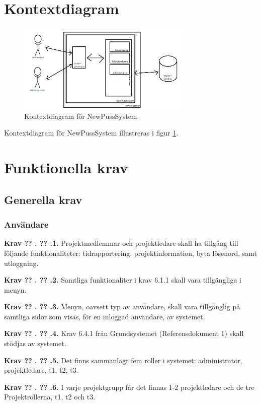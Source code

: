 \documentclass[a4paper]{article}
\newcommand\getcurrentref[1]{%
 \ifnumequal{\value{#1}}{0}
  {??}
  {\the\value{#1}}%
}
\newcommand\requirement[2]{
	\numberedrow{Krav}{#1}{#2}
}
\newcommand\numberedrow[3]{
	\noindent
	\textbf{#1 \getcurrentref{section}.\getcurrentref{subsection}.#2.} #3
	
}
\begin{document}
\section{Kontextdiagram}

\begin{figure}[H]
  \centering
    \includegraphics[width=0.75\textwidth]{context}
   \caption{Kontextdiagram för NewPussSystem.}
   \label{image_kontext}
\end{figure}
Kontextdiagram för NewPussSystem illustreras i figur \ref{image_kontext}.


\section{Funktionella krav}
	\subsection{Generella krav}
		\label{krav-funk-gen}
		\subsubsection*{Användare}
		\requirement{1}{Projektmedlemmar och projektledare skall ha tillgång till följande funktionaliteter: tidrapportering, projektinformation, byta lösenord, samt utloggning.}
		
		\requirement{2}{Samtliga funktionaliter i krav 6.1.1 skall vara tillgängliga i menyn.}
		\requirement{3}{Menyn, oavsett typ av användare, skall vara tillgänglig på samtliga sidor som visas, för en inloggad användare, av systemet.}
		\requirement{4}{Krav 6.4.1 från Grundsystemet (Referensdokument 1) skall stödjas av systemet.}
		\requirement{5}{Det finns sammanlagt fem roller i systemet: administratör, projektledare, t1, t2, t3.}
		\requirement{6}{I varje projektgrupp får det finnas 1-2 projektledare och de tre Projektrollerna, t1, t2 och t3.}
\end{document}
